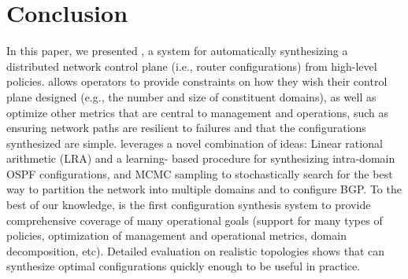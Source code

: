 \section{Conclusion}

In this paper, we presented \name, a system for automatically synthesizing a
distributed network control plane (i.e., router configurations) from
high-level policies. \name allows operators to provide constraints on
how they wish their control plane designed (e.g., the number and size
of constituent domains), as well as optimize other metrics that are
central to management and operations, such as ensuring network paths
are resilient to failures and that the configurations synthesized are
simple. \name leverages a novel combination of ideas: Linear rational
arithmetic (LRA) and a learning- based procedure for synthesizing
intra-domain OSPF configurations, and MCMC sampling to stochastically
search for the best way to partition the network into multiple domains
and to configure BGP. To the best of our knowledge, \name is the first
configuration synthesis system to provide comprehensive coverage of
many operational goals (support for many types of policies,
optimization of management and operational metrics, domain
decomposition, etc). Detailed evaluation on realistic topologies shows
that \name can synthesize optimal configurations quickly enough to be
useful in practice.

